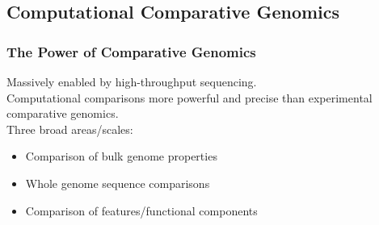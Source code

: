 
\subsection{Computational Comparative Genomics}

\begin{frame}
  \frametitle{The Power of Comparative Genomics}
  Massively enabled by high-throughput sequencing.\\
  Computational comparisons more powerful and precise than experimental comparative genomics.\\[0.5cm]
  Three broad areas/scales:
  \begin{itemize}
    \item Comparison of bulk genome properties
    \item Whole genome sequence comparisons
    \item Comparison of features/functional components
  \end{itemize}    
\end{frame}

